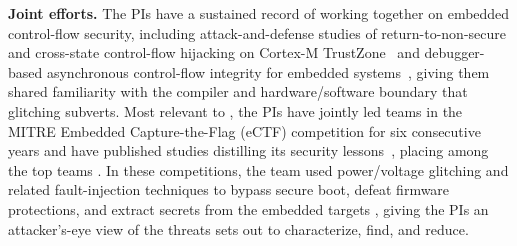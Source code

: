 \noindent\textbf{Joint efforts.}
The PIs have a sustained record of working together on embedded control-flow security, including attack-and-defense studies of return-to-non-secure and cross-state control-flow hijacking on Cortex-M TrustZone~\cite{ma2023dac, ma2025microft} and debugger-based asynchronous control-flow integrity for embedded systems~\cite{wang24insect}, giving them shared familiarity with the compiler and hardware/software boundary that glitching subverts.
Most relevant to \sysname, the PIs have jointly led teams in the MITRE Embedded Capture-the-Flag (eCTF) competition for six consecutive years and have published studies distilling its security lessons~\cite{ma2025ectf, ma2026wejust}, placing among the top teams .
In these competitions, the team used power/voltage glitching and related fault-injection techniques to bypass secure boot, defeat firmware protections, and extract secrets from the embedded targets , giving the PIs an attacker's-eye view of the threats \sysname sets out to characterize, find, and reduce.
